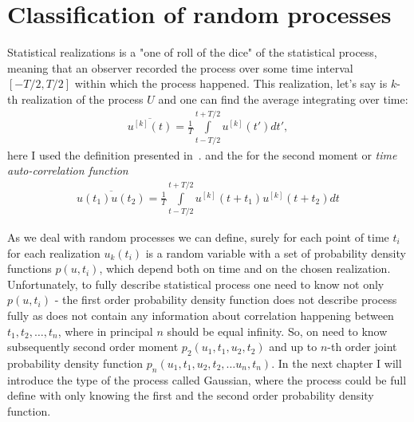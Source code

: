 \section{Classification of random processes}
    Statistical realizations is a "one of roll of the dice" of the statistical process, meaning that an observer recorded the process over some time interval $[-T/2, T/2]$ within which the process happened. This realization, let's say is $k$-th realization of the process $U$ and one can find the average integrating over time:
    \begin{align}
        \overline{u^{[k]}(t)} = \frac{1}{T} \int \limits_{t - T/2}^{t + T/2}  u^{[k]}(t') dt',
        \label{Eq:time_avr}
    \end{align}
    here I used the definition presented in~.
    and the for the second moment or \textit{time auto-correlation function}
    \begin{align}
        \overline{u(t_1)u(t_2)} = \frac{1}{T} \int \limits_{t - T/2}^{t + T/2} u^{[k]}(t + t_1)u^{[k]}(t + t_2)dt
        \label{Eq:time_autocorrelation}
    \end{align}

    As we deal with random processes we can define, surely for each point of time $t_i$ for each realization $u_k(t_i)$ is a random variable with a set of probability density functions $p(u, t_i)$, which depend both on time and on the chosen realization. Unfortunately, to fully describe statistical process one need to know not only $p(u, t_i)$ - the first order probability density function does not describe process fully as does not contain any information about correlation happening between $t_1, t_2, …, t_n$, where in principal $n$ should be equal infinity. So, on need to know subsequently second order moment $p_2(u_1, t_1, u_2, t_2)$ and up to $n$-th order joint probability density function $p_n(u_1, t_1, u_2, t_2, …u_n, t_n)$. In the next chapter I will introduce the type of the process called Gaussian, where the process could be full define with only knowing the first and the second order probability density function.

